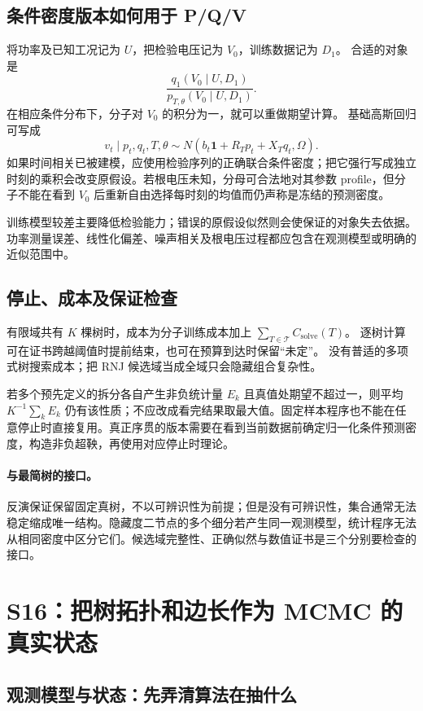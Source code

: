 \documentclass[UTF8,11pt,fontset=fandol,openany,oneside]{ctexbook}
\theoremstyle{definition}
\theoremstyle{remark}
\numberwithin{equation}{chapter}
\begin{document}
\subsection{条件密度版本如何用于 P/Q/V}

将功率及已知工况记为 $U$，把检验电压记为 $V_0$，训练数据记为 $D_1$。
合适的对象是
\[
 \frac{q_1(V_0\mid U,D_1)}
 {p_{T,\theta}(V_0\mid U,D_1)}.
\]
在相应条件分布下，分子对 $V_0$ 的积分为一，就可以重做期望计算。
基础高斯回归可写成
\[
 v_t\mid p_t,q_t,T,\theta
 \sim N(b_t\mathbf1+R_Tp_t+X_Tq_t,\Omega).
\]
如果时间相关已被建模，应使用检验序列的正确联合条件密度；把它强行写成独立时刻的乘积会改变原假设。若根电压未知，分母可合法地对其参数 profile，但分子不能在看到 $V_0$ 后重新自由选择每时刻的均值而仍声称是冻结的预测密度。

训练模型较差主要降低检验能力；错误的原假设似然则会使保证的对象失去依据。功率测量误差、线性化偏差、噪声相关及根电压过程都应包含在观测模型或明确的近似范围中。

\subsection{停止、成本及保证检查}

有限域共有 $K$ 棵树时，成本为分子训练成本加上
$\sum_{T\in\mathcal T}C_{\mathrm{solve}}(T)$。
逐树计算可在证书跨越阈值时提前结束，也可在预算到达时保留“未定”。
没有普适的多项式树搜索成本；把 RNJ 候选域当成全域只会隐藏组合复杂性。

若多个预先定义的拆分各自产生非负统计量 $E_k$ 且真值处期望不超过一，则平均
$K^{-1}\sum_kE_k$ 仍有该性质；不应改成看完结果取最大值。固定样本程序也不能在任意停止时直接复用。真正序贯的版本需要在看到当前数据前确定归一化条件预测密度，构造非负超鞅，再使用对应停止时理论。

\paragraph{与最简树的接口。}
反演保证保留固定真树，不以可辨识性为前提；但是没有可辨识性，集合通常无法稳定缩成唯一结构。隐藏度二节点的多个细分若产生同一观测模型，统计程序无法从相同密度中区分它们。候选域完整性、正确似然与数值证书是三个分别要检查的接口。

\section{S16：把树拓扑和边长作为 MCMC 的真实状态}
\label{sec:textbook-S16}

\subsection{观测模型与状态：先弄清算法在抽什么}
\end{document}
